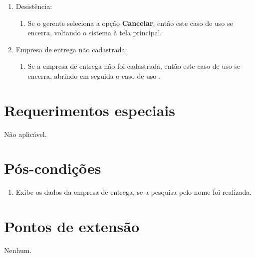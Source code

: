 \begin{enumerate}
	\item Desistência:
	\begin{enumerate}
		\item Se o gerente seleciona a opção \textbf{Cancelar}, então este caso de uso se encerra, voltando o sistema à tela principal.
	\end{enumerate}
	\item Empresa de entrega não cadastrada:
	\begin{enumerate}
		\item Se a empresa de entrega não foi cadastrada, então este caso de uso se encerra, abrindo em seguida o caso de uso .
	\end{enumerate}
\end{enumerate}

\section{Requerimentos especiais}

Não aplicável.

\section{Pós-condições}

\begin{enumerate}
	\item Exibe os dados da empresa de entrega, se a pesquisa pelo nome foi realizada.
\end{enumerate}

\section{Pontos de extensão}

Nenhum.